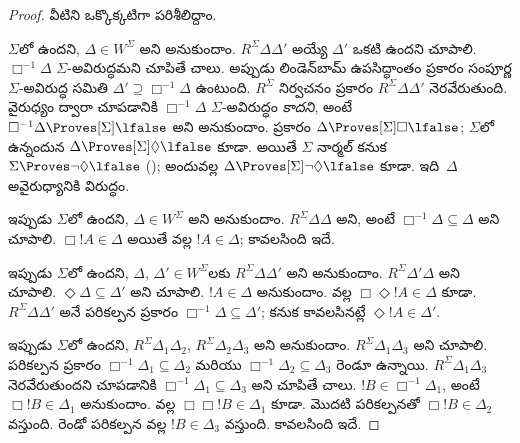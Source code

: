 \documentclass[../../../include/open-logic-section]{subfiles}
\begin{document}
\begin{proof}
  వీటిని ఒక్కొక్కటిగా పరిశీలిద్దాం.

  $\Sigma$లో  ఉందని, $\Delta \in W^\Sigma$ అని
  అనుకుందాం. $R^\Sigma \Delta\Delta'$ అయ్యే $\Delta'$ ఒకటి
  ఉందని చూపాలి. $\Box^{-1}\Delta$ $\Sigma$-అవిరుద్ధమని
  చూపితే చాలు. అప్పుడు లిండెన్‌బామ్ ఉపసిద్ధాంతం ప్రకారం
  సంపూర్ణ $\Sigma$-అవిరుద్ధ సమితి
  $\Delta' \supseteq \Box^{-1}\Delta$ ఉంటుంది.
  $R^\Sigma$ నిర్వచనం ప్రకారం
  $R^\Sigma \Delta\Delta'$ నెరవేరుతుంది. వైరుధ్యం ద్వారా చూపడానికి
  $\Box^{-1}\Delta$ $\Sigma$-అవిరుద్ధం \emph{కాదని}, అంటే
  $\Box^{-1}\Delta \Proves[\Sigma] \lfalse$ అని అనుకుందాం.
   ప్రకారం $\Delta \Proves[\Sigma]
  \Box\lfalse$; $\Sigma$లో  ఉన్నందున
  $\Delta \Proves[\Sigma] \Diamond\lfalse$ కూడా. అయితే
  $\Sigma$ నార్మల్ కనుక $\Sigma \Proves \lnot\Diamond
  \lfalse$ (); అందువల్ల
  $\Delta \Proves[\Sigma] \lnot\Diamond \lfalse$ కూడా.
  ఇది~$\Delta$ అవైరుధ్యానికి విరుద్ధం.

  ఇప్పుడు $\Sigma$లో  ఉందని, $\Delta \in W^\Sigma$
  అని అనుకుందాం. $R^\Sigma \Delta\Delta$ అని, అంటే
  $\Box^{-1}\Delta \subseteq \Delta$ అని చూపాలి.
  $\Box!A \in \Delta$ అయితే  వల్ల $!A \in \Delta$;
  కావలసింది ఇదే.

  ఇప్పుడు $\Sigma$లో  ఉందని, $\Delta$,
  $\Delta' \in W^\Sigma$లకు $R^\Sigma \Delta\Delta'$
  అని అనుకుందాం. $R^\Sigma \Delta'\Delta$ అని చూపాలి.
  $\Diamond\Delta \subseteq \Delta'$ అని చూపాలి.
  $!A \in \Delta$ అనుకుందాం.  వల్ల
  $\Box\Diamond!A \in \Delta$ కూడా. $R^\Sigma
  \Delta\Delta'$ అనే పరికల్పన  ప్రకారం
  $\Box^{-1}\Delta \subseteq \Delta'$; కనుక కావలసినట్లే
  $\Diamond!A \in \Delta'$.

  ఇప్పుడు $\Sigma$లో  ఉందని, $R^\Sigma
  \Delta_1\Delta_2$, $R^\Sigma \Delta_2\Delta_3$ అని
  అనుకుందాం. $R^\Sigma \Delta_1\Delta_3$ అని చూపాలి.
  పరికల్పన  ప్రకారం
  $\Box^{-1}\Delta_1 \subseteq \Delta_2$ మరియు
  $\Box^{-1}\Delta_2 \subseteq \Delta_3$ రెండూ ఉన్నాయి.
  $R^\Sigma \Delta_1\Delta_3$ నెరవేరుతుందని చూపడానికి
  $\Box^{-1}\Delta_1 \subseteq \Delta_3$ అని చూపితే చాలు.
  $!B \in \Box^{-1}\Delta_1$, అంటే $\Box!B \in
  \Delta_1$ అనుకుందాం.  వల్ల $\Box\Box!B \in
  \Delta_1$ కూడా. మొదటి పరికల్పనతో
  $\Box!B \in \Delta_2$ వస్తుంది. రెండో పరికల్పన వల్ల
  $!B \in \Delta_3$ వస్తుంది. కావలసింది ఇదే.


\end{proof}
\end{document}
